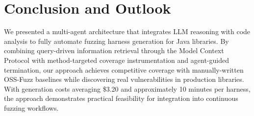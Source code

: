 \documentclass[sigconf,review,anonymous]{acmart}
\begin{document}



\maketitle









\section{Conclusion and Outlook}

We presented a multi-agent architecture that integrates LLM reasoning with code analysis to fully automate fuzzing harness generation for Java libraries. By combining query-driven information retrieval through the Model Context Protocol with method-targeted coverage instrumentation and agent-guided termination, our approach achieves competitive coverage with manually-written OSS-Fuzz baselines while discovering real vulnerabilities in production libraries. With generation costs averaging \$3.20 and approximately 10 minutes per harness, the approach demonstrates practical feasibility for integration into continuous fuzzing workflows.

%



\end{document}
